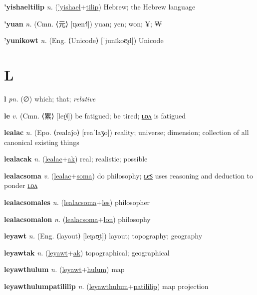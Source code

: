 \textbf{\hypertarget{'yishaeltilip}{'yishaeltilip}} \textit{n.} (\hyperlink{'yishael}{'yishael}+\allowbreak \hyperlink{tilip}{tilip})
Hebrew; the Hebrew language

\textbf{\hypertarget{'yuan}{'yuan}} \textit{n.} (Cmn. ⟨{\chinese{}元}⟩ [ɥæn˧˥])
yuan; yen; won; ¥; ₩

\textbf{\hypertarget{'yunikowt}{'yunikowt}} \textit{n.} (Eng. ⟨Unicode⟩ [ˈjunɪkoʊ̯d])
Unicode

\section{L}

\textbf{\hypertarget{l}{l}} \textit{pn.} (∅)
which; that; \textit{relative}

\textbf{\hypertarget{le}{le}} \textit{v.} (Cmn. ⟨{\chinese{}累}⟩ [leɪ̯˥˩])
be fatigued; be tired; \hyperlink{lelon}{ʟᴏᴧ} is fatigued

\textbf{\hypertarget{lealac}{lealac}} \textit{n.} (Epo. ⟨realaĵo⟩ [reaˈlaʒo])
reality; universe; dimension; collection of all canonical existing things

\textbf{\hypertarget{lealacak}{lealacak}} \textit{n.} (\hyperlink{lealac}{lealac}+\allowbreak \hyperlink{ak}{ak})
real; realistic; possible

\textbf{\hypertarget{lealacsoma}{lealacsoma}} \textit{v.} (\hyperlink{lealac}{lealac}+\allowbreak \hyperlink{soma}{soma})
do philosophy; \hyperlink{lealacsomales}{ʟєꜱ} uses reasoning and deduction to ponder \hyperlink{lealacsomalon}{ʟᴏᴧ}

\textbf{\hypertarget{lealacsomales}{lealacsomales}} \textit{n.} (\hyperlink{lealacsoma}{lealacsoma}+\allowbreak \hyperlink{les}{les})
philosopher

\textbf{\hypertarget{lealacsomalon}{lealacsomalon}} \textit{n.} (\hyperlink{lealacsoma}{lealacsoma}+\allowbreak \hyperlink{lon}{lon})
philosophy

\textbf{\hypertarget{leyawt}{leyawt}} \textit{n.} (Eng. ⟨layout⟩ [leɪ̯aʊ̯t])
layout; topography; geography

\textbf{\hypertarget{leyawtak}{leyawtak}} \textit{n.} (\hyperlink{leyawt}{leyawt}+\allowbreak \hyperlink{ak}{ak})
topographical; geographical

\textbf{\hypertarget{leyawthulum}{leyawthulum}} \textit{n.} (\hyperlink{leyawt}{leyawt}+\allowbreak \hyperlink{hulum}{hulum})
map

\textbf{\hypertarget{leyawthulumpatililip}{leyawthulumpatililip}} \textit{n.} (\hyperlink{leyawthulum}{leyawthulum}+\allowbreak \hyperlink{patililip}{patililip})
map projection


